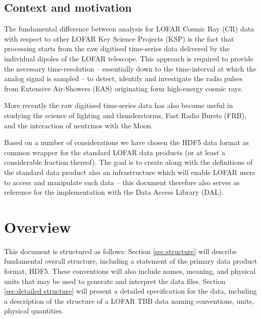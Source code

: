 \documentclass[a4paper,10pt,bibtotoc]{scrartcl}
\begin{document}
\subsection{Context and motivation}
\label{sec:context and motivation}

The fundamental difference between analysis for LOFAR Cosmic Ray (CR)
data with respect to other LOFAR Key Science Projects (KSP) is the
fact that processing starts from the raw digitised time-series data
delivered by the individual dipoles of the LOFAR telescope. This
approach is required to provide the necessary time-resolution --
essentially down to the time-interval at which the analog signal is
sampled -- to detect, identify and investigate the radio pulses from
Extensive Air-Showers (EAS) originating form high-energy cosmic rays.

More recently the raw digitised time-series data has also become useful 
in studying the science of lighting and thunderstorms, Fast Radio Bursts (FRB),
and the interaction of neutrinos with the Moon.

Based on a number of considerations we have chosen the HDF5 data
format as common wrapper for the standard LOFAR data products (or at
least a considerable fraction thereof). The goal is to create along
with the definitions of the standard data product also an
infrastructure which will enable LOFAR users to access and manipulate
such data -- this document therefore also serves as reference for the
implementation with the Data Access Library (DAL).




\section{Overview}
\label{sec:overview}

This document is structured as follows: %
Section \ref{sec:structure} will describe fundamental overall
structure, including a statement of the primary data product format,
HDF5. These conventions will also include names, meaning, and physical
units that may be used to generate and interpret the data files. %
Section \ref{sec:detailed structure} will present a detailed
specification for the data, including a description of the structure
of a LOFAR TBB data naming conventions, units, physical quantities. %
\end{document}
